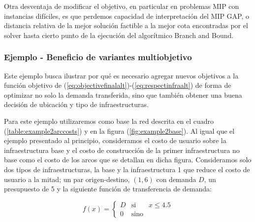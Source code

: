 \documentclass{article}
\begin{document}
  Otra desventaja de modificar el objetivo, en particular en problemas MIP con instancias difíciles, es que perdemos capacidad de interpretación del MIP GAP, o distancia relativa de la mejor solución factible a la mejor cota encontradas por el solver hasta cierto punto de la ejecución del algorítmico Branch and Bound.

  \subsubsection{Ejemplo - Beneficio de variantes multiobjetivo}
  \label{sect:example2}

  Este ejemplo busca ilustrar por qué es necesario agregar nuevos objetivos a la función objetivo de (\ref{eq:objectivefinalalt})-(\ref{eq:respectinfraalt}) de forma de optimizar no solo la demanda transferida, sino que también obtener una buena decisión de ubicación y tipo de infraestructuras.

  Para este ejemplo utilizaremos como base la red descrita en el cuadro (\ref{table:example2arccosts}) y en la figura (\ref{fig:example2base}). Al igual que el ejemplo presentado al principio, consideramos el costo de usuario sobre la infraestructura base y el costo de construcción de la primer infraestructura no base como el costo de los arcos que se detallan en dicha figura. Consideramos solo dos tipos de infraestructuras, la base y la infraestructura 1 que reduce el costo de usuario a la mitad; un par origen-destino, $(1, 6)$ con demanda $D$, un presupuesto de 5 y la siguiente función de transferencia de demanda:

  $$
    f(x) = \left\{ \begin{array}{lcr}
            D & \mbox{si}   & x \leq 4.5 \\
            0 & \mbox{sino} &
    \end{array}
    \right.
  $$
\end{document}
